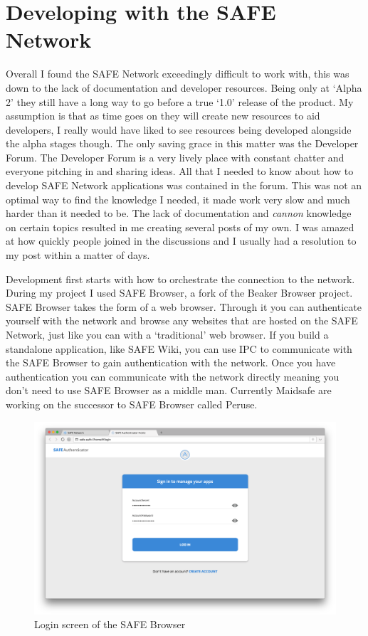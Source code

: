 \section{Developing with the SAFE Network}

Overall I found the SAFE Network exceedingly difficult to work with, this was down to the lack of documentation and developer resources. Being only at `Alpha 2' they still have a long way to go before a true `1.0' release of the product. My assumption is that as time goes on they will create new resources to aid developers, I really would have liked to see resources being developed alongside the alpha stages though. The only saving grace in this matter was the Developer Forum. The Developer Forum is a very lively place with constant chatter and everyone pitching in and sharing ideas. All that I needed to know about how to develop SAFE Network applications was contained in the forum. This was not an optimal way to find the knowledge I needed, it made work very slow and much harder than it needed to be. The lack of documentation and \textit{cannon} knowledge on certain topics resulted in me creating several posts of my own. I was amazed at how quickly people joined in the discussions and I usually had a resolution to my post within a matter of days.

Development first starts with how to orchestrate the connection to the network. During my project I used SAFE Browser, a fork of the Beaker Browser project. SAFE Browser takes the form of a web browser. Through it you can authenticate yourself with the network and browse any websites that are hosted on the SAFE Network, just like you can with a `traditional' web browser. If you build a standalone application, like SAFE Wiki, you can use IPC to communicate with the SAFE Browser to gain authentication with the network. Once you have authentication you can communicate with the network directly meaning you don't need to use SAFE Browser as a middle man. Currently Maidsafe are working on the successor to SAFE Browser called Peruse. 

\begin{figure}[h]
	\begin{center}
		\includegraphics[width=\textwidth]{images/safe-browser-login}
		\caption{Login screen of the SAFE Browser}
		\label{fig:safe-browser-login}
	\end{center}
\end{figure}

